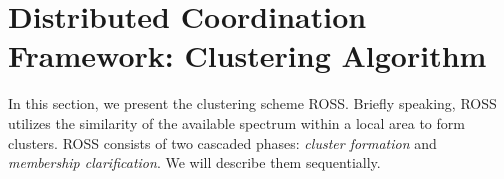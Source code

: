 \documentclass[journal,comsoc]{IEEEtran}
\theoremstyle{mytheoremstyle}
\theoremstyle{mytheoremstyle}
\theoremstyle{mytheoremstyle}
\begin{document}
\section{Distributed Coordination Framework: Clustering Algorithm}
\label{ross}



In this section, we present the clustering scheme ROSS.
Briefly speaking, ROSS utilizes the similarity of the available spectrum within a local area to form clusters.
ROSS consists of two cascaded phases: \textit{cluster formation} and \textit{membership clarification}.
We will describe them sequentially.
\end{document}
